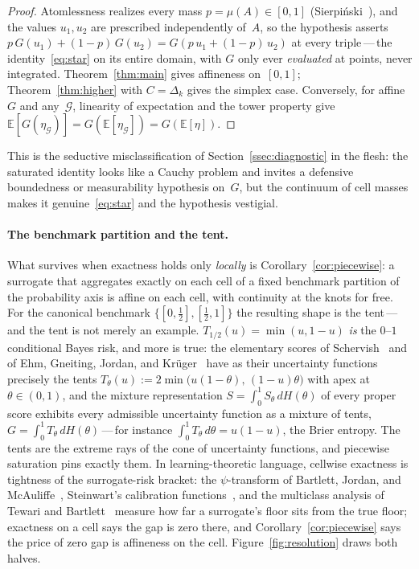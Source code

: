 \documentclass{article}
\theoremstyle{plain}
\theoremstyle{definition}
\newcommand{\E}{\mathbb{E}}
\begin{document}
\begin{proof}
Atomlessness realizes every mass $p=\mu(A)\in[0,1]$
(Sierpi\'nski~\cite{Sierpinski1922}), and the values $u_1,u_2$ are
prescribed independently of~$A$, so the hypothesis asserts
$p\,G(u_1)+(1-p)\,G(u_2)=G(p\,u_1+(1-p)\,u_2)$ at every
triple\,---\,the identity~\eqref{eq:star} on its entire domain, with
$G$ only ever \emph{evaluated} at points, never integrated.
Theorem~\ref{thm:main} gives affineness on~$[0,1]$;
Theorem~\ref{thm:higher} with $C=\Delta_k$ gives the simplex case.
Conversely, for affine~$G$ and any~$\mathcal{G}$, linearity of
expectation and the tower property give
$\E[G(\eta_{\mathcal{G}})]=G(\E[\eta_{\mathcal{G}}])=G(\E[\eta])$.
\end{proof}

This is the seductive misclassification of
Section~\ref{ssec:diagnostic} in the flesh: the saturated identity
looks like a Cauchy problem and invites a defensive boundedness or
measurability hypothesis on~$G$, but the continuum of cell masses
makes it genuine~\eqref{eq:star} and the hypothesis vestigial.

\paragraph{The benchmark partition and the tent.}
What survives when exactness holds only \emph{locally} is
Corollary~\ref{cor:piecewise}: a surrogate that aggregates exactly on
each cell of a fixed benchmark partition of the probability axis is
affine on each cell, with continuity at the knots for free. For the
canonical benchmark $\{[0,\tfrac12],[\tfrac12,1]\}$ the resulting
shape is the tent\,---\,and the tent is not merely an example.
$T_{1/2}(u)=\min(u,1-u)$ \emph{is} the $0$--$1$ conditional Bayes
risk, and more is true: the elementary scores of
Schervish~\cite{Schervish1989} and of Ehm, Gneiting, Jordan, and
Kr\"uger~\cite{EGJK2016} have as their uncertainty functions
precisely the tents $T_\theta(u) := 2 \min\big(u(1-\theta), \, (1-u)\theta\big)$ with apex at~$\theta\in(0,1)$, and the mixture
representation $S=\int_0^1 S_\theta\,dH(\theta)$ of every proper
score exhibits every admissible uncertainty function as a mixture of
tents, $G=\int_0^1 T_\theta\,dH(\theta)$\,---\,for instance
$\int_0^1 T_\theta\,d\theta=u(1-u)$, the Brier entropy. The tents are
the extreme rays of the cone of uncertainty functions, and piecewise
saturation pins exactly them. In learning-theoretic language,
cellwise exactness is tightness of the surrogate-risk bracket: the
$\psi$-transform of Bartlett, Jordan, and McAuliffe~\cite{BJM2006},
Steinwart's calibration functions~\cite{Steinwart2007}, and the
multiclass analysis of Tewari and
Bartlett~\cite{TewariBartlett2007} measure how far a surrogate's
floor sits from the true floor; exactness on a cell says the gap is
zero there, and Corollary~\ref{cor:piecewise} says the price of zero
gap is affineness on the cell. Figure~\ref{fig:resolution} draws
both halves.
\end{document}
